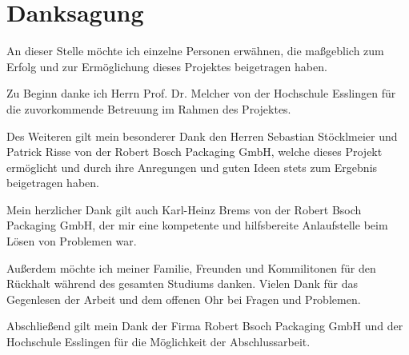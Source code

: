 \chapter*{Danksagung}
\thispagestyle{empty}

An dieser Stelle möchte ich einzelne Personen erwähnen, die maßgeblich zum Erfolg und zur Ermöglichung dieses Projektes
beigetragen haben.

Zu Beginn danke ich Herrn Prof. Dr. Melcher von der Hochschule Esslingen für die zuvorkommende Betreuung im Rahmen des
Projektes.

Des Weiteren gilt mein besonderer Dank den Herren Sebastian Stöcklmeier und Patrick Risse von der Robert Bosch Packaging
GmbH, welche dieses Projekt ermöglicht und durch ihre Anregungen und guten Ideen stets zum Ergebnis beigetragen haben.

Mein herzlicher Dank gilt auch Karl-Heinz Brems von der Robert Bsoch Packaging GmbH, der mir eine kompetente und
hilfsbereite Anlaufstelle beim Lösen von Problemen war.

Außerdem möchte ich meiner Familie, Freunden und Kommilitonen für den Rückhalt während des gesamten Studiums danken.
Vielen Dank für das Gegenlesen der Arbeit und dem offenen Ohr bei Fragen und Problemen.

Abschließend gilt mein Dank der Firma Robert Bsoch Packaging GmbH und der Hochschule Esslingen für die Möglichkeit der
Abschlussarbeit.